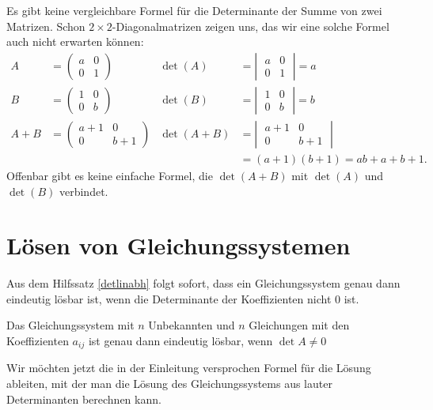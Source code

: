 Es gibt keine vergleichbare Formel für die Determinante der Summe
von zwei Matrizen.
Schon $2\times 2$-Diagonalmatrizen zeigen uns,
das wir eine solche Formel auch nicht erwarten können:
\begin{align*}
A&=\begin{pmatrix}a&0\\0&1\end{pmatrix}&
\det(A)&=\left|\;\begin{matrix}a  &0\\0&  1\end{matrix}\;\right|= a\\
B&=\begin{pmatrix}1&0\\0&b\end{pmatrix}&
\det(B)&=\left|\;\begin{matrix}  1&0\\0&b  \end{matrix}\;\right|= b\\
A+B&=\begin{pmatrix}a+1&0\\0&b+1\end{pmatrix}
&
\det(A+B)&=\left|\;\begin{matrix}a+1&0\\0&b+1\end{matrix}\;\right|\\
&&&=(a+1)(b+1)=ab+a+b+1.
\end{align*}
Offenbar gibt es keine einfache Formel, die $\det(A+B)$ mit $\det(A)$ und
$\det(B)$ verbindet.

\section{Lösen von Gleichungssystemen}
Aus dem Hilfssatz \ref{detlinabh} folgt sofort, dass ein Gleichungssystem
genau dann eindeutig lösbar ist, wenn die Determinante der Koeffizienten
nicht $0$ ist.

\begin{satz}
Das Gleichungssystem mit $n$ Unbekannten und $n$ Gleichungen
mit den Koeffizienten $a_{ij}$ ist genau dann eindeutig lösbar,
wenn
$\det A\ne 0$
\end{satz}

Wir möchten jetzt die in der Einleitung versprochen Formel für die Lösung
ableiten, mit der man die Lösung des Gleichungssystems aus lauter
Determinanten berechnen kann.

